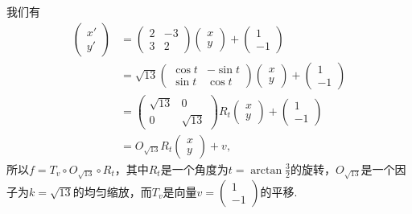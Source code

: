 \begin{solution}
  我们有
  \begin{align*}
    \begin{pmatrix}
      x' \\
      y'
    \end{pmatrix} & = \begin{pmatrix}
      2 & -3 \\
      3 & 2
    \end{pmatrix} \begin{pmatrix}
      x \\
      y
    \end{pmatrix} +
    \begin{pmatrix}
      1 \\
      -1
    \end{pmatrix} \\
    & = \sqrt{13} \begin{pmatrix}
      \cos t & -\sin t \\
      \sin t & \cos t
    \end{pmatrix} \begin{pmatrix}
      x \\
      y
    \end{pmatrix} + \begin{pmatrix}
      1 \\
      -1
    \end{pmatrix} \\
    & = \begin{pmatrix}
      \sqrt{13} & 0 \\
      0 & \sqrt{13}
    \end{pmatrix} R_t\begin{pmatrix}
      x \\
      y
    \end{pmatrix} + \begin{pmatrix}
      1 \\
      -1
    \end{pmatrix} \\
    & = O_{\sqrt{13}}R_t\begin{pmatrix}
      x \\
      y
    \end{pmatrix} + v,
  \end{align*}
  所以$f=T_v\circ O_{\sqrt{13}}\circ R_t$，其中$R_t$是一个角度为$t=\arctan\frac32$的旋转，$O_{\sqrt{13}}$是一个因子为$k=\sqrt{13}$的均匀缩放，而$T_v$是向量$v=\begin{pmatrix}
      1 \\
      -1
    \end{pmatrix}$的平移.
\end{solution}

